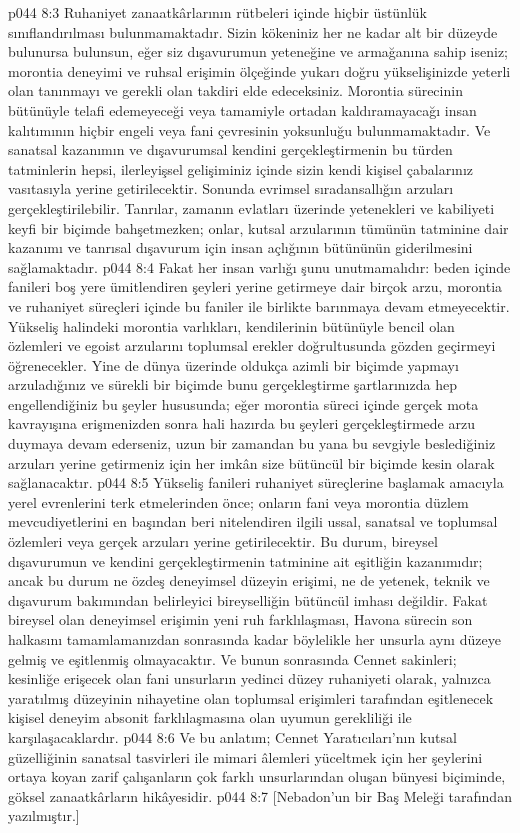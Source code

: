 \vs p044 8:3 Ruhaniyet zanaatkârlarının rütbeleri içinde hiçbir üstünlük sınıflandırılması bulunmamaktadır. Sizin kökeniniz her ne kadar alt bir düzeyde bulunursa bulunsun, eğer siz dışavurumun yeteneğine ve armağanına sahip iseniz; morontia deneyimi ve ruhsal erişimin ölçeğinde yukarı doğru yükselişinizde yeterli olan tanınmayı ve gerekli olan takdiri elde edeceksiniz. Morontia sürecinin bütünüyle telafi edemeyeceği veya tamamiyle ortadan kaldıramayacağı insan kalıtımının hiçbir engeli veya fani çevresinin yoksunluğu bulunmamaktadır. Ve sanatsal kazanımın ve dışavurumsal kendini gerçekleştirmenin bu türden tatminlerin hepsi, ilerleyişsel gelişiminiz içinde sizin kendi kişisel çabalarınız vasıtasıyla yerine getirilecektir. Sonunda evrimsel sıradansallığın arzuları gerçekleştirilebilir. Tanrılar, zamanın evlatları üzerinde yetenekleri ve kabiliyeti keyfi bir biçimde bahşetmezken; onlar, kutsal arzularının tümünün tatminine dair kazanımı ve tanrısal dışavurum için insan açlığının bütününün giderilmesini sağlamaktadır.
\vs p044 8:4 Fakat her insan varlığı şunu unutmamalıdır: beden içinde fanileri boş yere ümitlendiren şeyleri yerine getirmeye dair birçok arzu, morontia ve ruhaniyet süreçleri içinde bu faniler ile birlikte barınmaya devam etmeyecektir. Yükseliş halindeki morontia varlıkları, kendilerinin bütünüyle bencil olan özlemleri ve egoist arzularını toplumsal erekler doğrultusunda gözden geçirmeyi öğrenecekler. Yine de dünya üzerinde oldukça azimli bir biçimde yapmayı arzuladığınız ve sürekli bir biçimde bunu gerçekleştirme şartlarınızda hep engellendiğiniz bu şeyler hususunda; eğer morontia süreci içinde gerçek mota kavrayışına erişmenizden sonra hali hazırda bu şeyleri gerçekleştirmede arzu duymaya devam ederseniz, uzun bir zamandan bu yana bu sevgiyle beslediğiniz arzuları yerine getirmeniz için her imkân size bütüncül bir biçimde kesin olarak sağlanacaktır.
\vs p044 8:5 Yükseliş fanileri ruhaniyet süreçlerine başlamak amacıyla yerel evrenlerini terk etmelerinden önce; onların fani veya morontia düzlem mevcudiyetlerini en başından beri nitelendiren ilgili ussal, sanatsal ve toplumsal özlemleri veya gerçek arzuları yerine getirilecektir. Bu durum, bireysel dışavurumun ve kendini gerçekleştirmenin tatminine ait eşitliğin kazanımıdır; ancak bu durum ne özdeş deneyimsel düzeyin erişimi, ne de yetenek, teknik ve dışavurum bakımından belirleyici bireyselliğin bütüncül imhası değildir. Fakat bireysel olan deneyimsel erişimin yeni ruh farklılaşması, Havona sürecin son halkasını tamamlamanızdan sonrasında kadar böylelikle her unsurla aynı düzeye gelmiş ve eşitlenmiş olmayacaktır. Ve bunun sonrasında Cennet sakinleri; kesinliğe erişecek olan fani unsurların yedinci düzey ruhaniyeti olarak, yalnızca yaratılmış düzeyinin nihayetine olan toplumsal erişimleri tarafından eşitlenecek kişisel deneyim absonit farklılaşmasına olan uyumun gerekliliği ile karşılaşacaklardır.
\vs p044 8:6 Ve bu anlatım; Cennet Yaratıcıları’nın kutsal güzelliğinin sanatsal tasvirleri ile mimari âlemleri yüceltmek için her şeylerini ortaya koyan zarif çalışanların çok farklı unsurlarından oluşan bünyesi biçiminde, göksel zanaatkârların hikâyesidir.
\vs p044 8:7 [Nebadon’un bir Baş Meleği tarafından yazılmıştır.]
